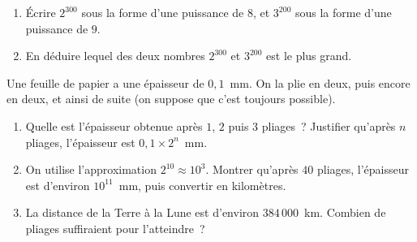 \documentclass[a4paper,11pt,fleqn]{article}
\begin{document}
\begin{EXO}{}{}
\begin{enumerate}
	\item Écrire $2^{300}$ sous la forme d'une puissance de $8$, et $3^{200}$ sous la forme d'une puissance de $9$.
	\item En déduire lequel des deux nombres $2^{300}$ et $3^{200}$ est le plus grand.
\end{enumerate}
\end{EXO}

\begin{EXO}{}{}
Une feuille de papier a une épaisseur de $0{,}1$~mm. On la plie en deux, puis encore en deux, et ainsi de suite (on suppose que c'est toujours possible).
\begin{enumerate}
	\item Quelle est l'épaisseur obtenue après $1$, $2$ puis $3$ pliages~? Justifier qu'après $n$ pliages, l'épaisseur est $0{,}1\times 2^n$~mm.
	\item On utilise l'approximation $2^{10}\approx 10^3$. Montrer qu'après $40$ pliages, l'épaisseur est d'environ $10^{11}$~mm, puis convertir en kilomètres.
	\item La distance de la Terre à la Lune est d'environ $384\,000$~km. Combien de pliages suffiraient pour l'atteindre~?
\end{enumerate}
\end{EXO}


\ifdefined\ELEVE\else
\clearpage
{}
\end{document}

